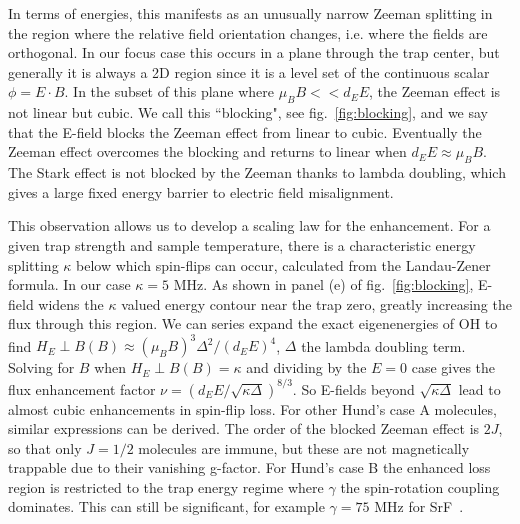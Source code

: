 \documentclass[%
 reprint,
groupedaddress,
 amsmath,amssymb,
 aps,
prl,
]{revtex4-1}
\newcommand{\epb}{$E\!\perp\!B$}
\newcommand{\epbm}{E\!\perp\!B}
\begin{document}
In terms of energies, this manifests as an unusually narrow Zeeman splitting in the region where the relative field orientation changes, i.e. where the fields are orthogonal. In our focus case this occurs in a plane through the trap center, but generally it is always a 2D region since it is a level set of the continuous scalar $\phi = E\cdot B$. In the subset of this plane where $\mu_BB<<d_EE$, the Zeeman effect is not linear but cubic. We call this ``blocking", see fig.~\ref{fig:blocking}, and we say that the E-field blocks the Zeeman effect from linear to cubic. Eventually the Zeeman effect overcomes the blocking and returns to linear when $d_EE\approx\mu_BB$. The Stark effect is not blocked by the Zeeman thanks to lambda doubling, which gives a large fixed energy barrier to electric field misalignment.

This observation allows us to develop a scaling law for the enhancement. For a given trap strength and sample temperature, there is a characteristic energy splitting $\kappa$ below which spin-flips can occur, calculated from the Landau-Zener formula. In our case $\kappa=5\text{ MHz}$. As shown in panel (e) of fig.~\ref{fig:blocking}, E-field widens the $\kappa$ valued energy contour near the trap zero, greatly increasing the flux through this region. We can series expand the exact eigenenergies of OH to find $H_\epbm(B)\approx (\mu_BB)^3\Delta^2/(d_EE)^4$, $\Delta$ the lambda doubling term. Solving for $B$ when $H_\epbm(B)=\kappa$ and dividing by the $E=0$ case gives the flux enhancement factor $\nu = (d_EE/\sqrt{\kappa\Delta})^{8/3}$. So E-fields beyond $\sqrt{\kappa\Delta}$ lead to almost cubic enhancements in spin-flip loss. For other Hund's case A molecules, similar expressions can be derived. The order of the blocked Zeeman effect is $2J$, so that only $J=1/2$ molecules are immune, but these are not magnetically trappable due to their vanishing g-factor. For Hund's case B the enhanced loss region is restricted to the trap energy regime where $\gamma$ the spin-rotation coupling dominates. This can still be significant, for example $\gamma=75\text{ MHz}$ for SrF~\cite{Quemener2016}. 


\end{document}
